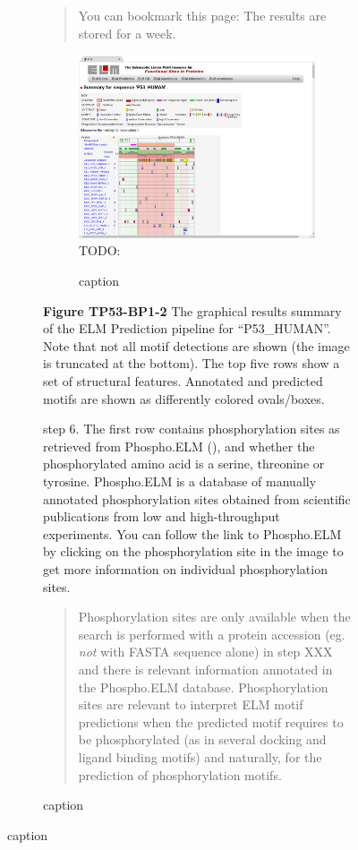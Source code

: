 {\begin{figure}[h!]
{{\begin{figure}[h!]
{{\begin{quote}
You can bookmark this page: The results are stored for a week.
\end{quote}

\begin{figure}[h!]
\centering
\includegraphics[width=\textwidth]{Figures/TP53_1/elm_results_summary.png} TODO:
\caption{
caption
}
\end{figure}

\textbf{Figure TP53-BP1-2} The graphical results summary of the ELM
Prediction pipeline for ``P53\_HUMAN''. Note that not all motif
detections are shown (the image is truncated at the bottom). The top
five rows show a set of structural features. Annotated and predicted
motifs are shown as differently colored ovals/boxes.

step 6. The first row contains phosphorylation sites as retrieved from
Phospho.ELM (\cite{21062810}), and whether the phosphorylated amino acid
is a serine, threonine or tyrosine. Phospho.ELM is a database of
manually annotated phosphorylation sites obtained from scientific
publications from low and high-throughput experiments. You can follow
the link to Phospho.ELM by clicking on the phosphorylation site in the
image to get more information on individual phosphorylation sites.

\begin{quote}
Phosphorylation sites are only available when the search is performed
with a protein accession (eg. \emph{not} with FASTA sequence alone) in
step XXX and there is relevant information annotated in the Phospho.ELM
database. Phosphorylation sites are relevant to interpret ELM motif
predictions when the predicted motif requires to be phosphorylated (as
in several docking and ligand binding motifs) and naturally, for the
prediction of phosphorylation motifs.
\end{quote}

}}
\end{figure}}}
\end{figure}}
